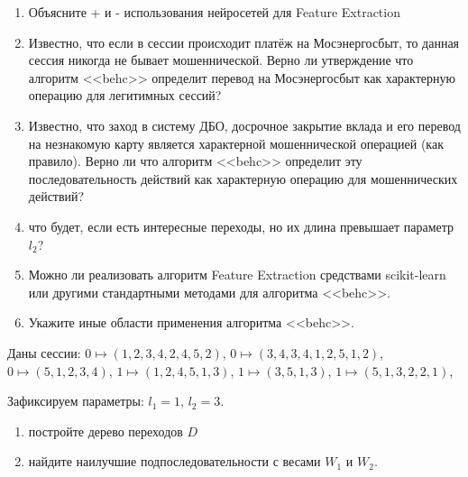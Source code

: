 \begin{frame}
	\small
	\begin{enumerate}
		\item Объясните + и - использования нейросетей для Feature Extraction
		\item Известно, что если в сессии происходит платёж на Мосэнергосбыт, то 
		данная сессия никогда не бывает мошеннической. Верно ли утверждение что алгоритм
		<<behc>> определит перевод на Мосэнергосбыт как характерную операцию для легитимных сессий?
		\item Известно, что заход в систему ДБО, досрочное закрытие вклада и его перевод 
		на незнакомую карту является характерной мошеннической операцией (как правило).
		Верно ли что алгоритм
		<<behc>> определит эту последовательность действий как характерную операцию для мошеннических действий?
		\item что будет, если есть интересные переходы, но их длина превышает параметр $l_2$?
		\item Можно ли реализовать алгоритм Feature Extraction средствами scikit-learn 
		или другими стандартными методами для алгоритма <<behc>>.
		\item Укажите иные области применения алгоритма <<behc>>.
	\end{enumerate}
\end{frame}

\begin{frame}
	Даны сессии:
	$0 \longmapsto (1, 2, 3, 4, 2, 4, 5, 2)$,
	$0 \longmapsto (3, 4, 3, 4, 1, 2, 5, 1, 2)$,
	$0 \longmapsto (5, 1, 2, 3, 4)$,
	$1 \longmapsto (1, 2, 4, 5, 1, 3)$,
	$1 \longmapsto (3, 5, 1, 3)$,
	$1 \longmapsto (5, 1, 3, 2, 2, 1)$,
	
	Зафиксируем параметры: $l_1=1$, $l_2=3$.
	
	\begin{enumerate}
		\item постройте дерево переходов $D$
		\item найдите наилучшие подпоследовательности с весами $W_1$ и $W_2$.
	\end{enumerate}
	
	
	

\end{frame}

